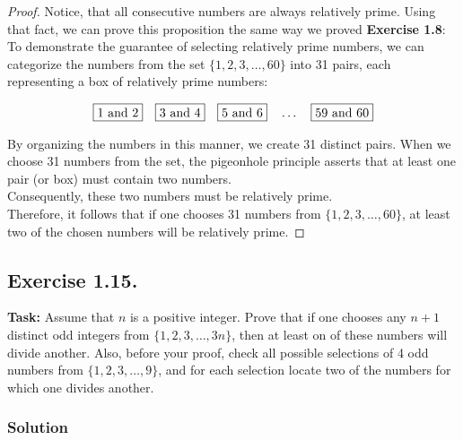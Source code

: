 \documentclass{article}
\begin{document}
\begin{proof}
    Notice, that all consecutive numbers are always relatively prime. Using that fact, we can prove this proposition the same way we proved \textbf{Exercise 1.8}: \\
    To demonstrate the guarantee of selecting relatively prime numbers, we can categorize the numbers from the set $\{1, 2, 3, \ldots, 60\}$ into 31 pairs, each representing a box of relatively prime numbers:

    \[
    \fbox{1 and 2} \quad \fbox{3 and 4} \quad \fbox{5 and 6} \quad \dots \quad \fbox{59 and 60}
    \]

    By organizing the numbers in this manner, we create 31 distinct pairs. When we choose 31 numbers from the set, the pigeonhole principle asserts that at least one pair (or box) must contain two numbers. \\Consequently, these two numbers must be relatively prime.\\
    Therefore, it follows that if one chooses 31 numbers from $\{1, 2, 3, \ldots, 60\}$, at least two of the chosen numbers will be relatively prime.
\end{proof}

\newpage

\subsection{Exercise 1.15.} 
\textbf{Task:} Assume that $n$ is a positive integer. Prove that if one chooses any $n+1$ distinct odd integers from $\{1, 2, 3, \ldots, 3n\}$, then at least on of these numbers will divide another. Also, before your proof, check all possible selections of 4 odd numbers from $\{1, 2, 3, \ldots, 9\}$, and for each selection locate two of the numbers for which one divides another.

\subsubsection*{Solution}
\end{document}

